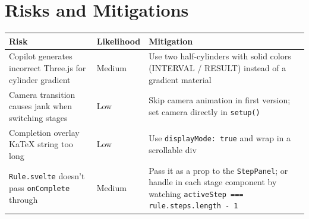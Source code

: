 \documentclass[11pt,a4paper]{article}
\begin{document}
\section{Risks and Mitigations}

\begin{center}
\begin{tabular}{p{5cm}p{4cm}p{4cm}}
\toprule
\textbf{Risk} & \textbf{Likelihood} & \textbf{Mitigation} \\\midrule
Copilot generates incorrect Three.js for cylinder gradient &
Medium &
Use two half-cylinders with solid colors (INTERVAL / RESULT) instead of a
gradient material \\
\addlinespace
Camera transition causes jank when switching stages &
Low &
Skip camera animation in first version; set camera directly in \texttt{setup()} \\
\addlinespace
Completion overlay KaTeX string too long &
Low &
Use \texttt{displayMode: true} and wrap in a scrollable div \\
\addlinespace
\texttt{Rule.svelte} doesn't pass \texttt{onComplete} through &
Medium &
Pass it as a prop to the \texttt{StepPanel}; or handle in each stage component
by watching \texttt{activeStep === rule.steps.length - 1} \\
\bottomrule
\end{tabular}
\end{center}
\end{document}
